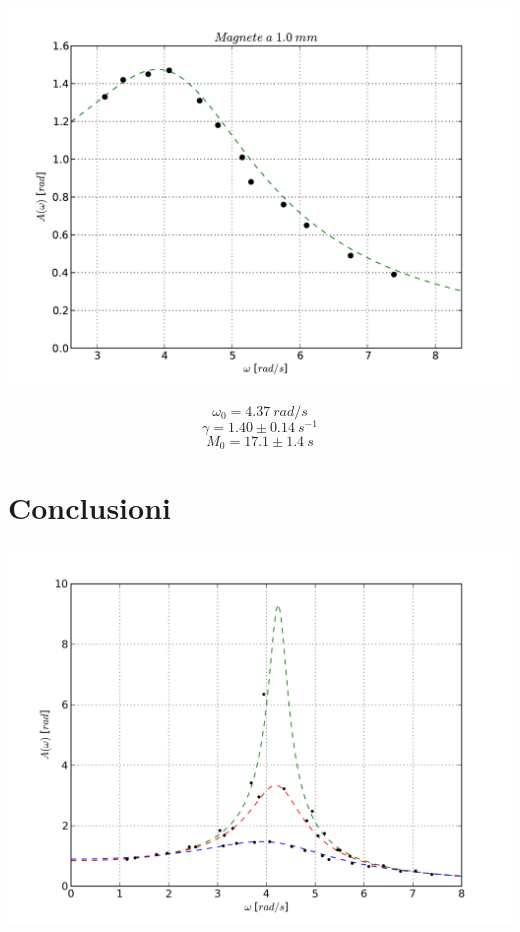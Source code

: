 \begin{center}
\includegraphics[scale=0.75]{"../grafici/Magnetea10mm"}
\end{center}

$$ \omega_0 = 4.37\ rad/s $$
$$ \gamma = 1.40 \pm 0.14\ s^{-1}$$
$$ M_0 = 17.1 \pm 1.4\ s$$

\pagebreak

\section{Conclusioni}

\begin{center}
\includegraphics[scale=0.85]{../grafici/risonanza}
\end{center}

